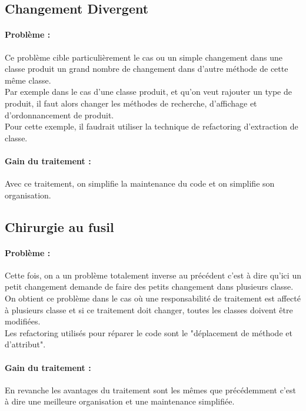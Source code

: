 \documentclass[a4paper,twoside,12pt,openright]{report}
\begin{document}
\subsection{Changement Divergent}
\paragraph{Problème :}
Ce problème cible particulièrement le cas ou un simple changement dans une classe produit un grand nombre de changement dans d'autre méthode de cette même classe.\\
Par exemple dans le cas d'une classe produit, et qu'on veut rajouter un type de produit, il faut alors changer les méthodes de recherche, d'affichage et d'ordonnancement de produit.\\
Pour cette exemple, il faudrait utiliser la technique de refactoring d'extraction de classe.\\

\paragraph{Gain du traitement :}
Avec ce traitement, on simplifie la maintenance du code et on simplifie son organisation.\\

\subsection{Chirurgie au fusil}
\paragraph{Problème :}
Cette fois, on a un problème totalement inverse au précédent c'est à dire qu'ici un petit changement demande de faire des petits changement dans plusieurs classe.\\
On obtient ce problème dans le cas où une responsabilité de traitement est affecté à plusieurs classe et si ce traitement doit changer, toutes les classes doivent être modifiées.\\
Les refactoring utilisés pour réparer le code sont le "déplacement de méthode et d'attribut".\\

\paragraph{Gain du traitement :}
En revanche les avantages du traitement sont les mêmes que précédemment c'est à dire une meilleure organisation et une maintenance simplifiée.\\
\end{document}
